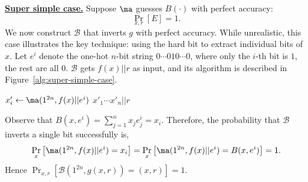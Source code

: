 \medskip
\noindent\textbf{\underline{Super simple case.}}
Suppose $\ma$ guesses $B(\cdot)$ with perfect accuracy:
$$\Pr_{x,r}[E] =1.$$
We now construct $\mathcal{B}$ that inverts $g$ with perfect accuracy. While unrealistic, this case illustrates the key technique: using the hard bit to extract individual bits of $x$.
Let $e^i$ denote the one-hot $n$-bit string $0\cdots 0 1 0 \cdots0$, where only the $i$-th bit is $1$, the rest are all $0$.
$\mathcal{B}$ gets $f(x)||r$ as input, and its algorithm is described in Figure~\ref{alg:super-simple-case}.

\begin{marginfigure}
\begin{algorithmic}
    \State $x'_i \gets \ma(1^{2n}, f(x)||e^i)$
\EndFor
\State \Return $x'_1\cdots x'_n || r$
\end{algorithmic}
\caption{Super-Simple Case $\mathcal{B}$} \label{alg:super-simple-case}
\end{marginfigure}
Observe that $B(x,e^i) = \sum_{j=1}^n x_je^i_j = x_i$. Therefore, the probability that $\mathcal{B}$ inverts a single bit successfully is,
$$\Pr_{x}\left[\ma(1^{2n}, f(x)||e^i)=x_i\right] =  \Pr_{x}\left[\ma(1^{2n}, f(x)||e^i)=B(x,e^i)\right] = 1.$$
Hence $\Pr_{x,r}[\mathcal{B}(1^{2n}, g(x,r)) = (x,r)] = 1$.


